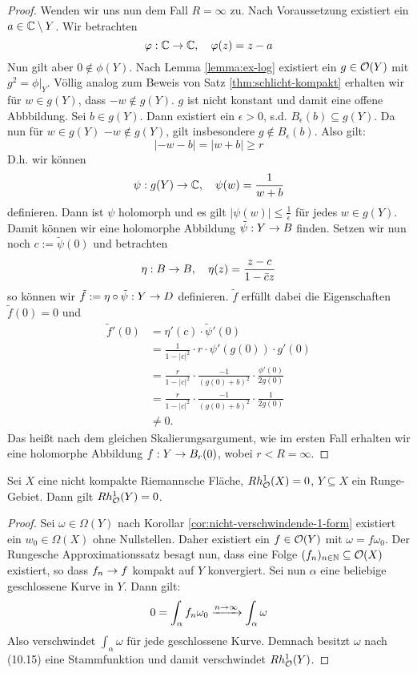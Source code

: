 \begin{proof}
  Wenden wir uns nun dem Fall $R = \infty$ zu. Nach Voraussetzung
  existiert ein $a \in \mathbb{C} \setminus Y$. Wir betrachten
  \[
  \varphi: \mathbb{C} \rightarrow \mathbb{C}, \quad \varphi(z) = z -a
  \]
  Nun gilt aber $0 \notin \phi(Y)$. Nach Lemma \ref{lemma:ex-log}
  existiert ein $g \in \mathcal{O}(Y)$ mit $g^2 = \phi|_Y$. Völlig analog
  zum Beweis von Satz \ref{thm:schlicht-kompakt} erhalten wir für $w
  \in g(Y)$, dass $-w \notin g(Y)$. $g$ ist nicht konstant und damit
  eine offene Abbbildung. Sei $b \in g(Y)$. Dann existiert ein
  $\epsilon > 0$, s.d. $B_{\epsilon}(b) \subseteq g(Y)$. Da nun für $w
  \in g(Y)$ $-w \notin g(Y)$, gilt insbesondere $g \notin
  B_\epsilon(b)$. Also gilt:
  \[
  |-w - b| = |w + b| \geq r
  \]
  D.h. wir können
  \[
  \psi: g(Y) \rightarrow \mathbb{C}, \quad \psi(w) = \frac{1}{w+b}
  \]
  definieren. Dann ist $\psi$ holomorph und es gilt $|\psi(w)| \leq
  \frac{1}{\epsilon}$ für jedes $w \in g(Y)$. 
  Damit können wir eine holomorphe Abbildung $\tilde \psi: Y \rightarrow B$
  finden. Setzen wir nun noch $c:= \tilde \psi(0)$ und betrachten
  \[
  \eta: B \rightarrow B, \quad \eta(z) = \frac{z-c}{1-\bar c z}
  \]
  so können wir $\tilde f := \eta \circ \tilde \psi: Y \rightarrow D$
  definieren. $\tilde f$ erfüllt dabei die Eigenschaften $\tilde f(0)
  = 0$ und
  \begin{align*}
    \tilde f'(0) & = \eta'(c) \cdot \tilde \psi'(0) \\
    & = \frac{1}{1- |c|^2} \cdot r \cdot \psi'(g(0)) \cdot g'(0) \\
    & = \frac{r}{1 - |c|^2} \cdot \frac{-1}{(g(0) + b)^2} \cdot
    \frac{\phi'(0)}{2 g(0)} \\
    & = \frac{r}{1- |c|^2} \cdot \frac{-1}{(g(0) + b)^2} \cdot
    \frac{1}{2 g(0)} \\
    & \neq 0.
  \end{align*}
  Das heißt nach dem gleichen Skalierungsargument, wie im ersten
  Fall erhalten wir eine holomorphe Abbildung $f: Y \rightarrow B_r(0)$, wobei
  $r < R = \infty$.
\end{proof}

\begin{lemma}
  \label{lemma:runge-keine-kohomo}
  Sei $X$ eine nicht kompakte Riemannsche Fläche, $Rh_{\mathcal{O}}^1(X) = 0$,
  $Y \subseteq X$ ein Runge-Gebiet. Dann gilt $Rh_{\mathcal{O}}^1(Y) = 0$.
\end{lemma}

\begin{proof}
  Sei $\omega \in \Omega(Y)$ nach Korollar
  \ref{cor:nicht-verschwindende-1-form} existiert ein $w_0 \in
  \Omega(X)$ ohne Nullstellen. Daher
  existiert ein $f \in \mathcal{O}(Y)$ mit $\omega = f \omega_0$. 
  Der Rungesche Approximationssatz besagt nun, dass eine Folge $(f_n)_{n
    \in \mathbb{N}} \subseteq \mathcal{O}(X)$ existiert, so dass $f_n \rightarrow f$ kompakt
  auf $Y$ konvergiert.
  Sei nun $\alpha$ eine beliebige geschlossene Kurve in $Y$. 
  Dann gilt:
  \[
  0 = \int_\alpha f_n \omega_0 \xrightarrow{n \rightarrow \infty} \int_\alpha
  \omega
  \]
  Also verschwindet $\int_\alpha \omega$ für jede geschlossene
  Kurve. Demnach besitzt $\omega$ nach (10.15) eine Stammfunktion und
  damit verschwindet $Rh_{\mathcal{O}}^1(Y)$.
\end{proof}



